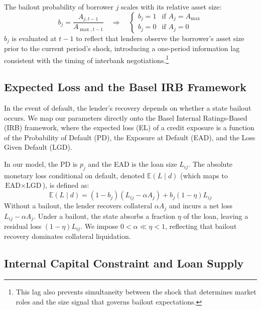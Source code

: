 \documentclass{article}
\begin{document}
The bailout probability of borrower $j$ scales with its relative asset size:
\begin{equation}
    b_{j} = \frac{A_{j,t-1}}{A_{\max,t-1}}
    \quad \Rightarrow \quad
    \begin{cases} b_{j} = 1 & \text{if } A_{j} = A_{\max} \\ b_{j} = 0 & \text{if } A_{j} = 0 \end{cases}
\end{equation}
$b_j$ is evaluated at $t-1$ to reflect that lenders observe the borrower's asset size
prior to the current period's shock, introducing a one-period information lag consistent
with the timing of interbank negotiations.\footnote{This lag also prevents simultaneity
between the shock that determines market roles and the size signal that governs bailout
expectations.}

\subsection{Expected Loss and the Basel IRB Framework}

In the event of default, the lender's recovery depends on whether a state bailout occurs.
We map our parameters directly onto the Basel Internal Ratings-Based (IRB) framework,
where the expected loss (EL) of a credit exposure is a function of the Probability of
Default (PD), the Exposure at Default (EAD), and the Loss Given Default (LGD).

In our model, the PD is $p_j$ and the EAD is the loan size $L_{ij}$. The absolute
monetary loss conditional on default, denoted $\mathbb{E}(L \mid d)$ (which maps to
$\text{EAD} \times \text{LGD}$), is defined as:
\begin{equation}
    \mathbb{E}(L \mid d) = (1 - b_{j})(L_{ij} - \alpha A_{j}) + b_{j}(1 - \eta)L_{ij}
\end{equation}
Without a bailout, the lender recovers collateral $\alpha A_j$ and incurs a net loss
$L_{ij} - \alpha A_j$. Under a bailout, the state absorbs a fraction $\eta$ of the loan,
leaving a residual loss $(1-\eta)L_{ij}$. We impose $0 < \alpha \ll \eta < 1$, reflecting
that bailout recovery dominates collateral liquidation.

\subsection{Internal Capital Constraint and Loan Supply}
\end{document}

